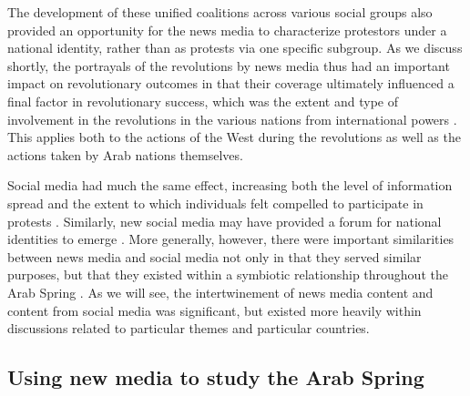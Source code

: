 The development of these unified coalitions across various social groups also provided an opportunity for the news media to characterize protestors under a national identity, rather than as protests via one specific subgroup.  As we discuss shortly, the portrayals of the revolutions by news media thus had an important impact on revolutionary outcomes in that their coverage ultimately influenced a final factor in revolutionary success, which was the extent and type of involvement in the revolutions in the various nations from international powers \cite{goldstone_bringing_2013,comunello_will_2012}.  This applies both to the actions of the West during the revolutions as well as the actions taken by Arab nations themselves.  

Social media had much the same effect, increasing both the level of information spread and the extent to which individuals felt compelled to participate in protests \citep{tufekci_social_2012,wolfsfeld_social_2013,bellin_reconsidering_2012}.   Similarly, new social media may have provided a forum for national identities to emerge \citep{cottle_media_2011}.  More generally, however, there were important similarities between news media and social media not only in that they served similar purposes, but that they existed within a symbiotic relationship throughout the Arab Spring \cite{cottle_media_2011}.  As we will see, the intertwinement of news media content and content from social media was significant, but existed more heavily within discussions related to particular themes and particular countries.


\subsection{Using new media to study the Arab Spring}

